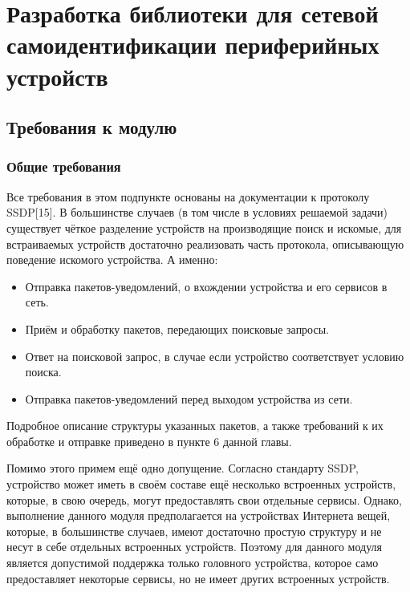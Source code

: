 \chapter{Разработка библиотеки для сетевой самоидентификации периферийных устройств}

\section{Требования к модулю}
	
\subsection{Общие требования}

Все требования в этом подпункте основаны на документации к протоколу SSDP[15].
В большинстве случаев (в том числе в условиях решаемой задачи) существует чёткое разделение устройств на производящие поиск и искомые, для встраиваемых устройств достаточно реализовать часть протокола, описывающую поведение искомого устройства.
А именно:
\begin{itemize}
	\item Отправка пакетов-уведомлений, о вхождении устройства и его сервисов в сеть.
	\item Приём и обработку пакетов, передающих поисковые запросы.
	\item Ответ на поисковой запрос, в случае если устройство соответствует условию поиска.
	\item Отправка пакетов-уведомлений перед выходом устройства из сети.
\end{itemize}
Подробное описание структуры указанных пакетов, а также требований к их обработке и отправке приведено в пункте 6 данной главы.

Помимо этого примем ещё одно допущение.
Согласно стандарту SSDP, устройство может иметь в своём составе ещё несколько встроенных устройств, которые, в свою очередь, могут предоставлять свои отдельные сервисы.
Однако, выполнение данного модуля предполагается на устройствах Интернета вещей, которые, в большинстве случаев, имеют достаточно простую структуру и не несут в себе отдельных встроенных устройств.
Поэтому для данного модуля является допустимой поддержка только головного устройства, которое само предоставляет некоторые сервисы, но не имеет других встроенных устройств.

